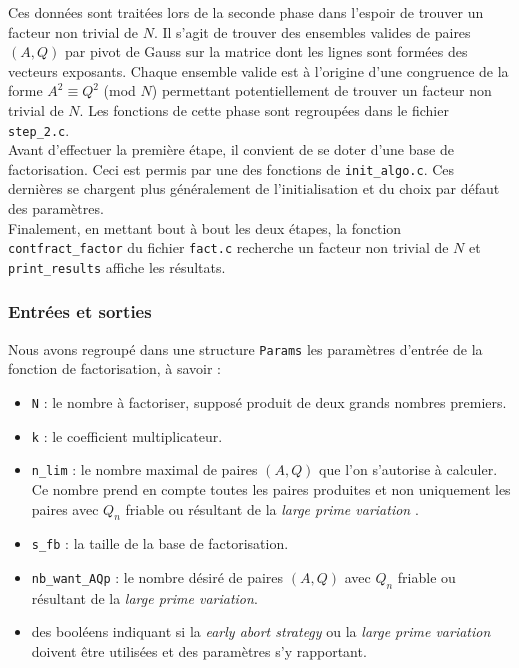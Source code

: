 Ces données sont traitées lors de la seconde phase dans l'espoir de trouver un 
facteur non trivial de $N$. Il s'agit de trouver des ensembles valides de paires
$(A, Q)$ par pivot de Gauss sur la matrice dont les lignes sont formées des 
vecteurs exposants. Chaque ensemble valide est à l'origine d'une congruence de 
la forme $A^2 \equiv Q^2$ (mod $N$) permettant potentiellement de trouver un
facteur non trivial de $N$. Les fonctions de cette phase sont regroupées dans 
le fichier \texttt{step\_2.c}. \\

Avant d'effectuer la première étape, il convient de se doter d'une base de 
factorisation. Ceci est permis par une des fonctions de \texttt{init\_algo.c}.
Ces dernières se chargent plus généralement de l'initialisation et du choix par
défaut des paramètres. \\

Finalement, en mettant bout à bout les deux étapes, la fonction 
\texttt{contfract\_factor} du fichier \texttt{fact.c} recherche un facteur
non trivial de $N$ et \texttt{print\_results} affiche les résultats. 

\subsubsection{Entrées et sorties}
Nous avons regroupé dans une structure \texttt{Params} les paramètres d'entrée 
de la fonction de factorisation, à savoir :

\begin{itemize}
    \item \texttt{N} : le nombre à factoriser, supposé produit de deux grands
                       nombres premiers.
    \item \texttt{k} : le coefficient multiplicateur.
    \item \texttt{n\_lim} : le nombre maximal de paires $(A,Q)$ que l'on 
                             s'autorise à calculer. Ce nombre prend en compte
                             toutes les paires produites et non uniquement les
                             paires avec $Q_n$ friable ou résultant de la  
                             \textit{large prime variation }.
    \item \texttt{s\_fb} : la taille de la base de factorisation. 
    \item \texttt{nb\_want\_AQp} : le nombre désiré de paires $(A,Q)$ avec $Q_n$ 
                                    friable ou résultant de la \textit{large prime 
                                   variation}.
                               \item des booléens indiquant si la \textit{early 
                                   abort strategy} ou la \textit{large prime variation}
                                   doivent être utilisées et des paramètres s'y rapportant.

\end{itemize}

